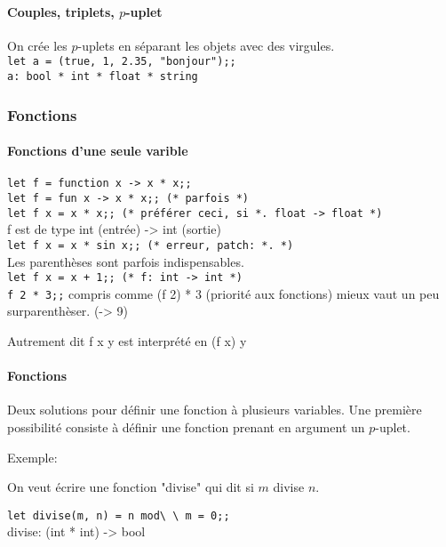 \documentclass{article}
\newcommand{\code}[1]{\lstinline[style = mystyle]{#1}}
\begin{document}
					\paragraph{Couples, triplets, $p$-uplet}
				
						On crée les $p$-uplets en séparant les objets avec des virgules.\\
						\code{let a = (true, 1, 2.35, "bonjour");;}\\
						\code{a: bool * int * float * string}

				\subsubsection{Fonctions}

					\paragraph{Fonctions d'une seule varible}

						\code{let f = function x -> x * x;;}\\
						\code{let f = fun x -> x * x;; (* parfois *)}\\
						\code{let f x = x * x;; (* préférer ceci, si *. float -> float *)}\\
						f est de type int (entrée) -> int (sortie)\\
						\code{let f x = x * sin x;; (* erreur, patch: *. *)}\\
						Les parenthèses sont parfois indispensables.\\
						\code{let f x = x + 1;; (* f: int -> int *)}\\
						\code{f 2 * 3;;} compris comme (f 2) * 3 (priorité aux fonctions) mieux vaut un peu surparenthèser. (-> 9)
						
						Autrement dit f x y est interprété en (f x) y
						
					\paragraph{Fonctions}
					
						Deux solutions pour définir une fonction à plusieurs variables. Une première possibilité consiste à définir une fonction prenant en argument un $p$-uplet.
						
						Exemple:
						
						On veut écrire une fonction "divise" qui dit si $m$ divise $n$.
						
						\code{let divise(m, n) = n mod\ \ m = 0;;}\\
						divise: (int * int) -> bool
						
\end{document}

